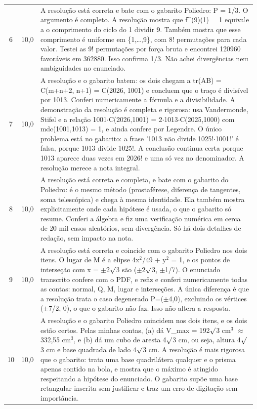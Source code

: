 \documentclass{article}%
\begin{document}
\begin{longtable}{@{}c c p{}@{}}
6 & 10,0 & A resolução está correta e bate com o gabarito Poliedro: P = 1/3. O argumento é completo. A resolução mostra que f\^{}(9)(1) = 1 equivale a o comprimento do ciclo do 1 dividir 9. Também mostra que esse comprimento é uniforme em \{1,\ldots{},9\}, com 8! permutações para cada valor. Testei as 9! permutações por força bruta e encontrei 120960 favoráveis em 362880. Isso confirma 1/3. Não achei divergências nem ambiguidades no enunciado. \\
7 & 10,0 & A resolução e o gabarito batem: os dois chegam a tr(AB) = C(m+n+2, n+1) = C(2026, 1001) e concluem que o traço é divisível por 1013. Conferi numericamente a fórmula e a divisibilidade. A demonstração da resolução é completa e rigorosa: usa Vandermonde, Stifel e a relação 1001$\cdot$C(2026,1001) = 2$\cdot$1013$\cdot$C(2025,1000) com mdc(1001,1013) = 1, e ainda confere por Legendre. O único problema está no gabarito: a frase '1013 não divide 1025!$\cdot$1001!' é falsa, porque 1013 divide 1025!. A conclusão continua certa porque 1013 aparece duas vezes em 2026! e uma só vez no denominador. A resolução merece a nota integral. \\
8 & 10,0 & A resolução está correta e completa, e bate com o gabarito do Poliedro: é o mesmo método (prostaférese, diferença de tangentes, soma telescópica) e chega à mesma identidade. Ela também mostra explicitamente onde cada hipótese é usada, o que o gabarito só resume. Conferi a álgebra e fiz uma verificação numérica em cerca de 20 mil casos aleatórios, sem divergência. Só há dois detalhes de redação, sem impacto na nota. \\
9 & 10,0 & A resolução está correta e coincide com o gabarito Poliedro nos dois itens. O lugar de M é a elipse 4x$^2$/49 + y$^2$ = 1, e os pontos de interseção com x = $\pm$2$\surd$3 são ($\pm$2$\surd$3, $\pm$1/7). O enunciado transcrito confere com o PDF, e refiz e conferi numericamente todas as contas: normal, Q, M, lugar e interseções. A única diferença é que a resolução trata o caso degenerado P=($\pm$4,0), excluindo os vértices ($\pm$7/2, 0), o que o gabarito não faz. Isso não altera a resposta. \\
10 & 10,0 & A resolução e o gabarito Poliedro coincidem nos dois itens, e os dois estão certos. Pelas minhas contas, (a) dá V\_max = 192$\surd$3 cm$^3$ $\approx$ 332,55 cm$^3$, e (b) dá um cubo de aresta 4$\surd$3 cm, ou seja, altura 4$\surd$3 cm e base quadrada de lado 4$\surd$3 cm. A resolução é mais rigorosa que o gabarito: trata uma base quadrilátera qualquer e o prisma apenas contido na bola, e mostra que o máximo é atingido respeitando a hipótese do enunciado. O gabarito supõe uma base retangular inscrita sem justificar e traz um erro de digitação sem importância. \\
\bottomrule\end{longtable}%
\end{document}
